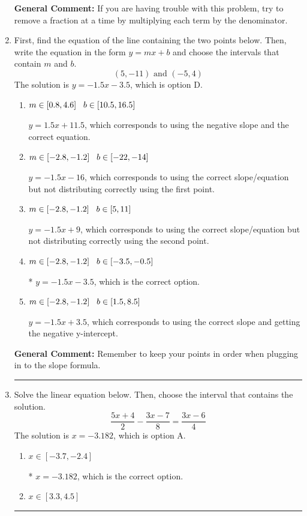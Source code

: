 \documentclass{extbook}[14pt]
\newcommand{\litem}[1]{\item #1

\rule{\textwidth}{0.4pt}}
\begin{document}
\begin{enumerate}
{\textbf{General Comment:} If you are having trouble with this problem, try to remove a fraction at a time by multiplying each term by the denominator.
}
\litem{
First, find the equation of the line containing the two points below. Then, write the equation in the form $ y=mx+b $ and choose the intervals that contain $m$ and $b$.
\[ (5, -11) \text{ and } (-5, 4) \]The solution is \( y = -1.5x -3.5 \), which is option D.\begin{enumerate}[label=\Alph*.]
\item \( m \in [0.8, 4.6] \hspace*{3mm} b \in [10.5, 16.5] \)

 $y = 1.5x + 11.5$, which corresponds to using the negative slope and the correct equation.
\item \( m \in [-2.8, -1.2] \hspace*{3mm} b \in [-22, -14] \)

 $y = -1.5x -16$, which corresponds to using the correct slope/equation but not distributing correctly using the first point.
\item \( m \in [-2.8, -1.2] \hspace*{3mm} b \in [5, 11] \)

 $y = -1.5x + 9$, which corresponds to using the correct slope/equation but not distributing correctly using the second point.
\item \( m \in [-2.8, -1.2] \hspace*{3mm} b \in [-3.5, -0.5] \)

* $y = -1.5x -3.5$, which is the correct option.
\item \( m \in [-2.8, -1.2] \hspace*{3mm} b \in [1.5, 8.5] \)

 $y = -1.5x + 3.5$, which corresponds to using the correct slope and getting the negative y-intercept.
\end{enumerate}

\textbf{General Comment:} Remember to keep your points in order when plugging in to the slope formula.
}
\litem{
Solve the linear equation below. Then, choose the interval that contains the solution.
\[ \frac{5x + 4}{2} - \frac{3x -7}{8} = \frac{3x -6}{4} \]The solution is \( x = -3.182 \), which is option A.\begin{enumerate}[label=\Alph*.]
\item \( x \in [-3.7, -2.4] \)

* $x = -3.182$, which is the correct option.
\item \( x \in [3.3, 4.5] \)


\end{enumerate}}
\end{enumerate}
\end{document}
